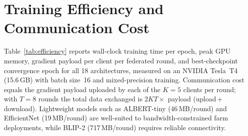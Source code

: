 \documentclass[conference]{IEEEtran}
\begin{document}
\section{Training Efficiency and Communication Cost}
\label{app:efficiency}

Table~\ref{tab:efficiency} reports wall-clock training time per epoch,
peak GPU memory, gradient payload per client per federated round, and
best-checkpoint convergence epoch for all 18 architectures, measured on
an NVIDIA Tesla~T4 (15.6\,GB) with batch size~16 and mixed-precision
training.  Communication cost equals the gradient payload uploaded by
each of the $K{=}5$ clients per round; with $T{=}8$ rounds the total
data exchanged is $2KT \times$ payload (upload\,+\,download).
Lightweight models such as ALBERT-tiny (46\,MB/round) and EfficientNet
(19\,MB/round) are well-suited to bandwidth-constrained farm deployments,
while BLIP-2 (717\,MB/round) requires reliable connectivity.
\end{document}

